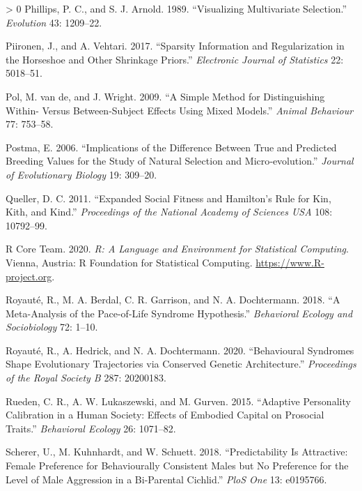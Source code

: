 \documentclass{article}
\newlength{\cslhangindent}
\newenvironment{CSLReferences}[3] %
 {%
  \setlength{\parindent}{0pt}
  \ifodd #1 \everypar{\setlength{\hangindent}{\cslhangindent}}\ignorespaces\fi
  \ifnum #2 > 0
  \setlength{\parskip}{#2\baselineskip}
  \fi
 }%
 {}
\begin{document}
\begin{CSLReferences}{1}{0}
\leavevmode\hypertarget{ref-Phillips1989}{}%
Phillips, P. C., and S. J. Arnold. 1989. {``Visualizing Multivariate
Selection.''} \emph{Evolution} 43: 1209--22.

\leavevmode\hypertarget{ref-Piir2017}{}%
Piironen, J., and A. Vehtari. 2017. {``Sparsity Information and
Regularization in the Horseshoe and Other Shrinkage Priors.''}
\emph{Electronic Journal of Statistics} 22: 5018--51.

\leavevmode\hypertarget{ref-Pol2009}{}%
Pol, M. van de, and J. Wright. 2009. {``A Simple Method for
Distinguishing Within- Versus Between-Subject Effects Using Mixed
Models.''} \emph{Animal Behaviour} 77: 753--58.

\leavevmode\hypertarget{ref-Postma2006}{}%
Postma, E. 2006. {``Implications of the Difference Between True and
Predicted Breeding Values for the Study of Natural Selection and
Micro‐evolution.''} \emph{Journal of Evolutionary Biology} 19: 309--20.

\leavevmode\hypertarget{ref-Queller2011}{}%
Queller, D. C. 2011. {``Expanded Social Fitness and Hamilton's Rule for
Kin, Kith, and Kind.''} \emph{Proceedings of the National Academy of
Sciences USA} 108: 10792--99.

\leavevmode\hypertarget{ref-Rbase}{}%
R Core Team. 2020. \emph{R: A Language and Environment for Statistical
Computing}. Vienna, Austria: R Foundation for Statistical Computing.
\url{https://www.R-project.org}.

\leavevmode\hypertarget{ref-Roy2018}{}%
Royauté, R., M. A. Berdal, C. R. Garrison, and N. A. Dochtermann. 2018.
{``A Meta-Analysis of the Pace-of-Life Syndrome Hypothesis.''}
\emph{Behavioral Ecology and Sociobiology} 72: 1--10.

\leavevmode\hypertarget{ref-Roy2020}{}%
Royauté, R., A. Hedrick, and N. A. Dochtermann. 2020. {``Behavioural
Syndromes Shape Evolutionary Trajectories via Conserved Genetic
Architecture.''} \emph{Proceedings of the Royal Society B} 287:
20200183.

\leavevmode\hypertarget{ref-Rueden2015}{}%
Rueden, C. R., A. W. Lukaszewski, and M. Gurven. 2015. {``Adaptive
Personality Calibration in a Human Society: Effects of Embodied Capital
on Prosocial Traits.''} \emph{Behavioral Ecology} 26: 1071--82.

\leavevmode\hypertarget{ref-Scherer2018}{}%
Scherer, U., M. Kuhnhardt, and W. Schuett. 2018. {``Predictability Is
Attractive: Female Preference for Behaviourally Consistent Males but No
Preference for the Level of Male Aggression in a Bi-Parental Cichlid.''}
\emph{PloS One} 13: e0195766.


\end{CSLReferences}
\end{document}
